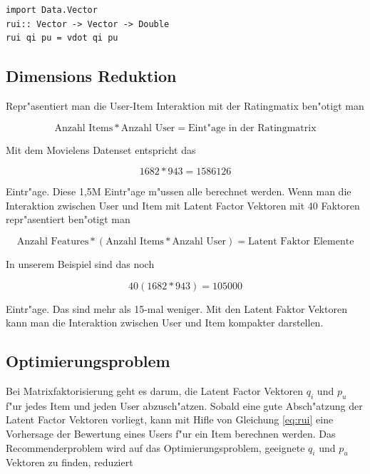 \documentclass[a4paper, 12pt]{article}
\begin{document}
\begin{lstlisting}[caption=Implementation der Vorhersage, label=lst:rui]
import Data.Vector
rui:: Vector -> Vector -> Double
rui qi pu = vdot qi pu
\end{lstlisting}

\subsection{Dimensions Reduktion}
\label{sec:dimred}

Repr"asentiert man die User-Item Interaktion mit der Ratingmatix ben"otigt man 

\begin{equation}
  \label{eq:dimre1}
  \text{Anzahl Items} * \text{Anzahl User} = \text{Eint"age in der Ratingmatrix}
\end{equation}

Mit dem Movielens Datenset entspricht das

\begin{equation}
  \label{eq:dimre}
  1682 * 943 = 1586126
\end{equation}

Eintr"age. Diese 1,5M Eintr"age m"ussen alle berechnet werden. Wenn man die Interaktion zwischen User und Item mit Latent Factor Vektoren mit 40 Faktoren repr"asentiert ben"otigt man 

\begin{equation}
  \label{eq:dimred}
  \text{Anzahl Features}* (\text{Anzahl Items}*\text{Anzahl User}) = \text{Latent Faktor Elemente}
\end{equation}

In unserem Beispiel sind das noch

\begin{equation}
  \label{eq:dimred1}
  40(1682*943) = 105000
\end{equation}

Eintr"age. Das sind mehr als 15-mal weniger. Mit den Latent Faktor Vektoren kann man die Interaktion zwischen User und Item kompakter darstellen.

\subsection{Optimierungsproblem}
\label{sec:optim}

Bei Matrixfaktorisierung geht es darum, die Latent Factor Vektoren $q_i$ und $p_u$ f"ur jedes Item und jeden User abzusch"atzen. Sobald eine gute Absch"atzung der Latent Factor Vektoren vorliegt, kann mit Hifle von Gleichung \ref{eq:rui} eine Vorhersage der Bewertung eines Users f"ur ein Item berechnen werden. Das Recommenderproblem wird auf das Optimierungsproblem, geeignete  $q_i$ und $p_u$ Vektoren zu finden, reduziert
\end{document}
